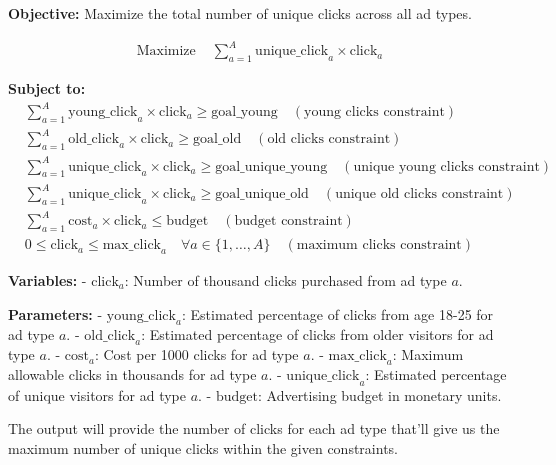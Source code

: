 \documentclass{article}
\begin{document}
\textbf{Objective:}
Maximize the total number of unique clicks across all ad types.

\begin{align*}
\text{Maximize } & \sum_{a=1}^{A} \text{unique\_click}_{a} \times \text{click}_{a}
\end{align*}

\textbf{Subject to:}
\begin{align*}
& \sum_{a=1}^{A} \text{young\_click}_{a} \times \text{click}_{a} \geq \text{goal\_young} \quad (\text{young clicks constraint})\\
& \sum_{a=1}^{A} \text{old\_click}_{a} \times \text{click}_{a} \geq \text{goal\_old} \quad (\text{old clicks constraint})\\
& \sum_{a=1}^{A} \text{unique\_click}_{a} \times \text{click}_{a} \geq \text{goal\_unique\_young} \quad (\text{unique young clicks constraint})\\
& \sum_{a=1}^{A} \text{unique\_click}_{a} \times \text{click}_{a} \geq \text{goal\_unique\_old} \quad (\text{unique old clicks constraint})\\
& \sum_{a=1}^{A} \text{cost}_{a} \times \text{click}_{a} \leq \text{budget} \quad (\text{budget constraint})\\
& 0 \leq \text{click}_{a} \leq \text{max\_click}_{a} \quad \forall a \in \{1, \ldots, A\} \quad (\text{maximum clicks constraint})
\end{align*}

\textbf{Variables:}
- \(\text{click}_{a}\): Number of thousand clicks purchased from ad type \(a\).

\textbf{Parameters:}
- \(\text{young\_click}_{a}\): Estimated percentage of clicks from age 18-25 for ad type \(a\).
- \(\text{old\_click}_{a}\): Estimated percentage of clicks from older visitors for ad type \(a\).
- \(\text{cost}_{a}\): Cost per 1000 clicks for ad type \(a\).
- \(\text{max\_click}_{a}\): Maximum allowable clicks in thousands for ad type \(a\).
- \(\text{unique\_click}_{a}\): Estimated percentage of unique visitors for ad type \(a\).
- \(\text{budget}\): Advertising budget in monetary units.

The output will provide the number of clicks for each ad type that'll give us the maximum number of unique clicks within the given constraints.
\end{document}
